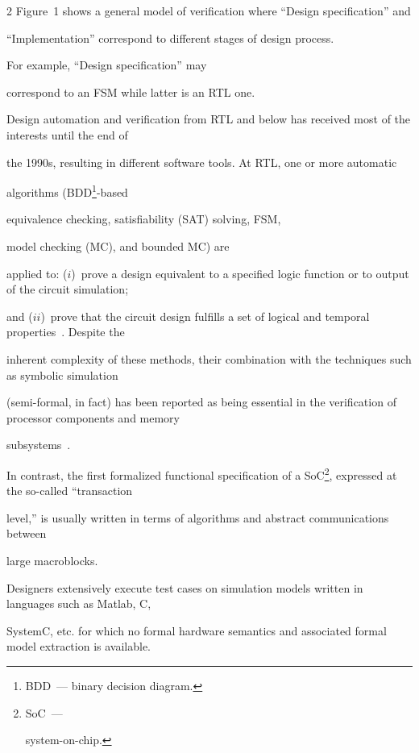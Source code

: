 \begin{multicols}{2}
Figure~1 shows a general model of verification where ``Design specification'' and


``Implementation'' correspond to different stages of design process.


For example, ``Design specification'' may


correspond to an FSM while latter is an RTL one.





   Design automation and verification from RTL and below has received most of the interests until the end of


the 1990s, resulting in different software tools. At RTL, one or more automatic


algorithms (BDD\footnote{BDD~--- binary decision diagram.}-based


equivalence checking, satisfiability (SAT) solving, FSM,


model checking (MC), and bounded MC) are


applied to: ($i$)~prove a design equivalent to a specified logic function or to output of the circuit simulation;


and ($ii$)~prove that the circuit design fulfills a set of logical and temporal properties~\cite{1bar}. Despite the


inherent complexity of these methods, their combination with the techniques such as symbolic simulation


(semi-formal, in fact) has been reported as being essential in the verification of processor components and memory


subsystems~\cite{8bar}.





   In contrast, the first formalized functional specification of a SoC\footnote{SoC~---


system-on-chip.}, expressed at the so-called ``transaction


level,'' is usually written in terms of algorithms and abstract communications between


large macroblocks.





   Designers extensively execute test cases on simu\-lation models written in languages such as Matlab, C,


SystemC, etc. for which no formal hardware semantics and associated formal model extraction is available.



\end{multicols}
